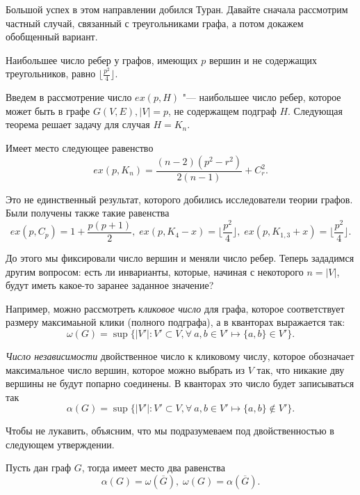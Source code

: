 	Большой успех в этом направлении добился Туран. Давайте сначала рассмотрим частный случай, связанный с треугольниками графа, а потом докажем обобщенный вариант.
	
\begin{theorem}
	Наибольшее число ребер у графов, имеющих $p$ вершин и не содержащих треугольников, равно $\lfloor \frac{p^2}{4} \rfloor$. 
\end{theorem}

	Введем в рассмотрение число $ex(p, H)$ "--- наибольшее число ребер, которое может быть в графе $G(V, E), |V| = p$, не содержащем подграф $H$. Следующая теорема решает задачу для случая $H = K_n$. 

\begin{theorem}[Турана]
	Имеет место следующее равенство
	$$ex(p, K_n) = \frac{(n-2)(p^2 - r^2)}{2(n-1)} + C_r^2.$$
\end{theorem}

	Это не единственный результат, которого добились исследователи теории графов. Были получены также такие равенства
	$$ex(p, C_p) = 1 + \frac{p(p+1)}{2}, \; ex(p, K_4 - x) = \lfloor \frac{p^2}{4}\rfloor, \; ex (p, K_{1, 3} + x) = \lfloor \frac{p^2}{4}\rfloor.$$


	До этого мы фиксировали число вершин и меняли число ребер. Теперь зададимся другим вопросом: есть ли инварианты, которые, начиная с некоторого $n = |V|$, будут иметь какое-то заранее заданное значение?
	
	Например, можно рассмотреть \emph{кликовое число} для графа, которое соответствует размеру максимаьной клики (полного подграфа), а в кванторах выражается так:
	$$\omega(G) = \sup \lbrace |V'| \colon V' \subset V, \forall \!\ a, b \in V' \mapsto \lbrace a, b\rbrace \in V'\rbrace.$$


	\emph{Число независимости} двойственное число к кликовому числу, которое обозначает максимальное число вершин, которое можно выбрать из $V$ так, что никакие дву вершины не будут попарно соединены. В кванторах это число будет записываться так
	$$\alpha(G) = \sup \lbrace |V'| \colon V' \subset V, \forall \!\ a, b \in V' \mapsto \lbrace a, b\rbrace \notin V'\rbrace.$$

	Чтобы не лукавить, объясним, что мы подразумеваем под двойственностью в следующем утверждении.
	
\begin{statement}
	Пусть дан граф $G$, тогда имеет место два равенства
	$$\alpha(G) = \omega(\overline{G}), \; \omega(G) = \alpha(\overline{G}).$$
\end{statement}

